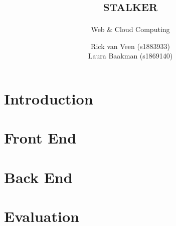 \documentclass{report}
\title{\textsc{stalker}}
\subtitle{Web \& Cloud Computing}
\author{Rick van Veen (s1883933)\\Laura Baakman (s1869140)}
\begin{document}
\maketitle

\chapter*{Introduction}
\label{ch:intro}


\chapter{Front End}
\label{ch:frontend}


\chapter{Back End}
\label{ch:backend}


\chapter{Evaluation}
\label{ch:eval}


\printbibliography
\end{document}
